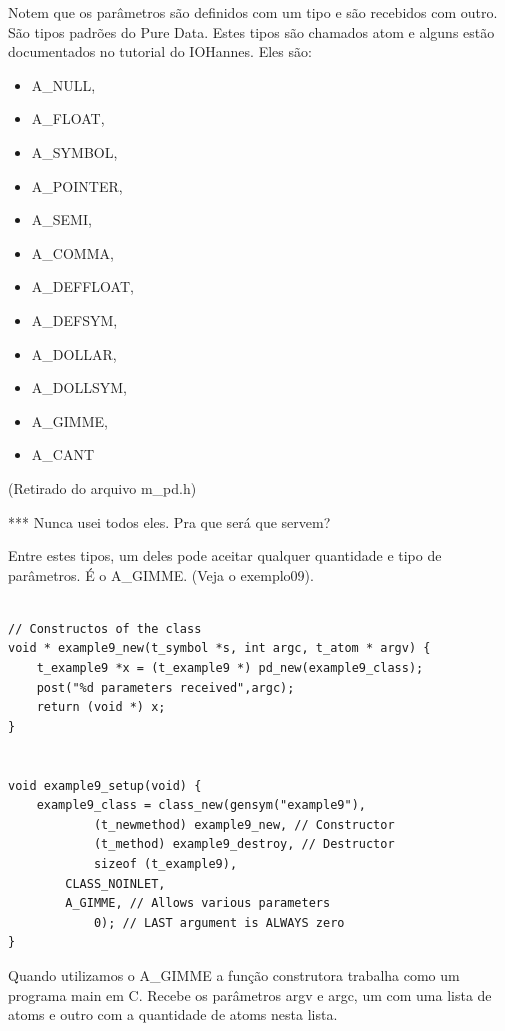 \documentclass[10pt,a4paper]{report}
\begin{document}
Notem que os parâmetros são definidos com um tipo e são recebidos com outro. São tipos padrões do Pure Data. Estes tipos são chamados atom e alguns estão documentados no tutorial do IOHannes. Eles são:
\begin{itemize}
\item A\_NULL,
\item A\_FLOAT,
\item A\_SYMBOL,
\item A\_POINTER,
\item A\_SEMI,
\item A\_COMMA,
\item A\_DEFFLOAT,
\item A\_DEFSYM,
\item A\_DOLLAR, 
\item A\_DOLLSYM,
\item A\_GIMME,
\item A\_CANT
\end{itemize}
(Retirado do arquivo m\_pd.h)

*** Nunca usei todos eles. Pra que será que servem?

Entre estes tipos, um deles pode aceitar qualquer quantidade e tipo de parâmetros. É o A\_GIMME. (Veja o exemplo09). 

\begin{lstlisting}

// Constructos of the class
void * example9_new(t_symbol *s, int argc, t_atom * argv) {
    t_example9 *x = (t_example9 *) pd_new(example9_class);
    post("%d parameters received",argc);
    return (void *) x;
}


void example9_setup(void) {
    example9_class = class_new(gensym("example9"),
            (t_newmethod) example9_new, // Constructor
            (t_method) example9_destroy, // Destructor
            sizeof (t_example9),
	    CLASS_NOINLET,
	    A_GIMME, // Allows various parameters
            0); // LAST argument is ALWAYS zero
}
\end{lstlisting}

Quando utilizamos o A\_GIMME a função construtora trabalha como um programa main em C. Recebe os parâmetros argv e argc, um com uma lista de atoms e outro com a quantidade de atoms nesta lista.
\end{document}
